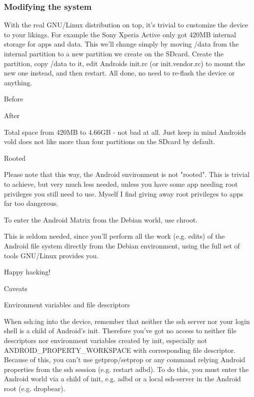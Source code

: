 \subsubsection{Modifying the system}

With the real GNU/Linux distribution on top, it's trivial to customize the
device to your likings. For example the Sony Xperia Active only got 420MB
internal storage for apps and data. This we'll change simply by moving /data
from the internal partition to a new partition we create on the SDcard. Create
the partition, copy /data to it, edit Androids init.rc (or init.vendor.rc) to
mount the new one instead, and then restart. All done, no need to re-flash the
device or anything.

Before

After

Total space from 420MB to 4.66GB - not bad at all. Just keep in mind Androids
vold does not like more than four partitions on the SDcard by default.

Rooted

Please note that this way, the Android environment is not "rooted". This is
trivial to achieve, but very much less needed, unless you have some app needing
root privileges you still need to use. Myself I find giving away root privileges
to apps far too dangerous.

To enter the Android Matrix from the Debian world, use chroot.


This is seldom needed, since you'll perform all the work (e.g. edits) of the
Android file system directly from the Debian environment, using the full set of
tools GNU/Linux provides you.

Happy hacking!

Caveats

Environment variables and file descriptors

When ssh:ing into the device, remember that neither the ssh server nor your
login shell is a child of Android's init. Therefore you've got no access to
neither file descriptors nor environment variables created by init, especially
not ANDROID\_PROPERTY\_WORKSPACE with corresponding file descriptor. Because of
this, you can't use getprop/setprop or any command relying Android properties
from the ssh session (e.g. restart adbd). To do this, you must enter the Android
world via a child of init, e.g. adbd or a local ssh-server in the Android root
(e.g. dropbear).

